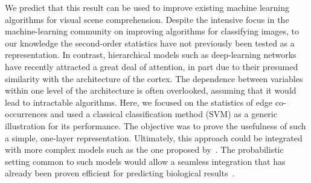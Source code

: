 \documentclass[a4paper]{article}
\begin{document}
We predict that this result can be used to improve existing machine learning algorithms 
for visual scene comprehension. 
Despite the intensive focus in the machine-learning community 
on improving algorithms for classifying images, 
to our knowledge the second-order statistics have not previously been tested as a representation. 
In contrast, hierarchical models such as deep-learning networks 
have recently attracted a great deal of attention, 
in part due to their presumed similarity with the architecture of the cortex. 
The dependence between variables within one level of the architecture is often overlooked, 
assuming that it would lead to intractable algorithms. 
Here, we focused on the statistics of edge co-occurrences 
and used a classical classification method (SVM) as a generic illustration for its performance. 
The objective was to prove the usefulness of such a simple, one-layer representation. 
Ultimately, this approach could be integrated with more complex models 
such as the one proposed by~\textcite{Serre07}. 
The probabilistic setting common to such models would allow a seamless integration 
that has already been proven efficient for predicting biological results~\autocite{Rao99,Lee03}. 
\end{document}
